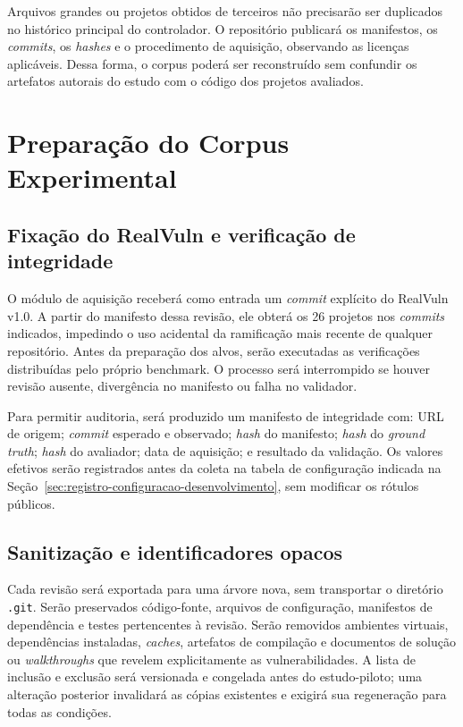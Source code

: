 Arquivos grandes ou projetos obtidos de terceiros não precisarão ser duplicados no histórico principal do controlador. O repositório publicará os manifestos, os \textit{commits}, os \textit{hashes} e o procedimento de aquisição, observando as licenças aplicáveis. Dessa forma, o corpus poderá ser reconstruído sem confundir os artefatos autorais do estudo com o código dos projetos avaliados.

\section{Preparação do Corpus Experimental}\label{sec:preparacao-corpus}

\subsection{Fixação do RealVuln e verificação de integridade}\label{subsec:fixacao-realvuln}

O módulo de aquisição receberá como entrada um \textit{commit} explícito do RealVuln v1.0. A partir do manifesto dessa revisão, ele obterá os 26 projetos nos \textit{commits} indicados, impedindo o uso acidental da ramificação mais recente de qualquer repositório. Antes da preparação dos alvos, serão executadas as verificações distribuídas pelo próprio benchmark. O processo será interrompido se houver revisão ausente, divergência no manifesto ou falha no validador.

Para permitir auditoria, será produzido um manifesto de integridade com: URL de origem; \textit{commit} esperado e observado; \textit{hash} do manifesto; \textit{hash} do \textit{ground truth}; \textit{hash} do avaliador; data de aquisição; e resultado da validação. Os valores efetivos serão registrados antes da coleta na tabela de configuração indicada na Seção~\ref{sec:registro-configuracao-desenvolvimento}, sem modificar os rótulos públicos.

\subsection{Sanitização e identificadores opacos}\label{subsec:sanitizacao-alvos}

Cada revisão será exportada para uma árvore nova, sem transportar o diretório \texttt{.git}. Serão preservados código-fonte, arquivos de configuração, manifestos de dependência e testes pertencentes à revisão. Serão removidos ambientes virtuais, dependências instaladas, \textit{caches}, artefatos de compilação e documentos de solução ou \textit{walkthroughs} que revelem explicitamente as vulnerabilidades. A lista de inclusão e exclusão será versionada e congelada antes do estudo-piloto; uma alteração posterior invalidará as cópias existentes e exigirá sua regeneração para todas as condições.

